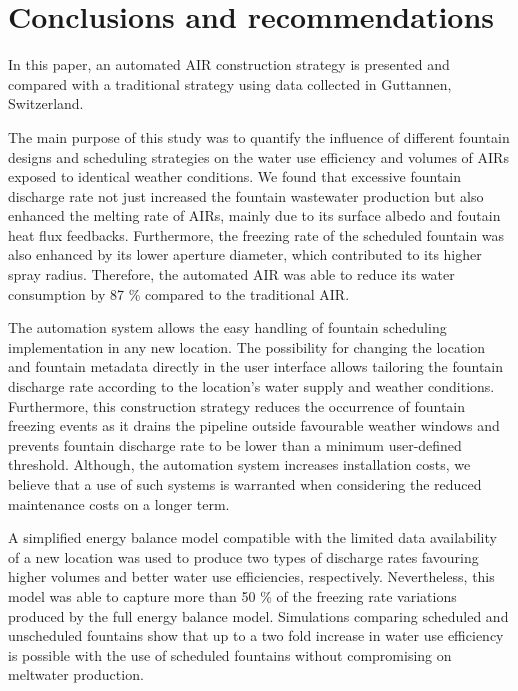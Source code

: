 \documentclass[tc, manuscript]{copernicus}
\begin{document}
\section{Conclusions and recommendations}

In this paper, an automated AIR construction strategy is presented and compared with a traditional strategy
using data collected in Guttannen, Switzerland.

The main purpose of this study was to quantify the influence of different fountain designs and scheduling
strategies on the water use efficiency and volumes of AIRs exposed to identical weather conditions. We found
that excessive fountain discharge rate not just increased the fountain wastewater production but also enhanced
the melting rate of AIRs, mainly due to its surface albedo and foutain heat flux feedbacks. Furthermore, the
freezing rate of the scheduled fountain was also enhanced by its lower aperture diameter, which contributed to
its higher spray radius. Therefore, the automated AIR was able to reduce its water consumption by 87 \% compared
to the traditional AIR.

The automation system allows the easy handling of fountain scheduling implementation in any new location. The
possibility for changing the location and fountain metadata directly in the user interface allows tailoring the
fountain discharge rate according to the location's water supply and weather conditions. Furthermore, this
construction strategy reduces the occurrence of fountain freezing events as it drains the pipeline outside
favourable weather windows and prevents fountain discharge rate to be lower than a minimum user-defined
threshold. Although, the automation system increases installation costs, we believe that a use of such systems
is warranted when considering the reduced maintenance costs on a longer term.

A simplified energy balance model compatible with the limited data availability of a new location was used to
produce two types of discharge rates favouring higher volumes and better water use efficiencies, respectively.
Nevertheless, this model was able to capture more than 50 \% of the freezing rate variations produced by the
full energy balance model. Simulations comparing scheduled and unscheduled fountains show that up to a two fold
increase in water use efficiency is possible with the use of scheduled fountains without compromising on
meltwater production.
\end{document}
